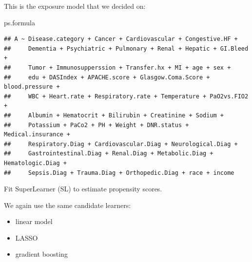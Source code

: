 \documentclass[
]{book}
\newenvironment{Shaded}{\begin{snugshade}}{\end{snugshade}}
\newcommand{\AttributeTok}[1]{\textcolor[rgb]{0.77,0.63,0.00}{#1}}
\newcommand{\DecValTok}[1]{\textcolor[rgb]{0.00,0.00,0.81}{#1}}
\newcommand{\FunctionTok}[1]{\textcolor[rgb]{0.00,0.00,0.00}{#1}}
\newcommand{\NormalTok}[1]{#1}
\newcommand{\OtherTok}[1]{\textcolor[rgb]{0.56,0.35,0.01}{#1}}
\newcommand{\SpecialCharTok}[1]{\textcolor[rgb]{0.00,0.00,0.00}{#1}}
\newcommand{\StringTok}[1]{\textcolor[rgb]{0.31,0.60,0.02}{#1}}
\providecommand{\tightlist}{%
  \setlength{\itemsep}{0pt}\setlength{\parskip}{0pt}}
\begin{document}
This is the exposure model that we decided on:

\begin{Shaded}
\begin{Highlighting}[]
\NormalTok{ps.formula}
\end{Highlighting}
\end{Shaded}

\begin{verbatim}
## A ~ Disease.category + Cancer + Cardiovascular + Congestive.HF + 
##     Dementia + Psychiatric + Pulmonary + Renal + Hepatic + GI.Bleed + 
##     Tumor + Immunosupperssion + Transfer.hx + MI + age + sex + 
##     edu + DASIndex + APACHE.score + Glasgow.Coma.Score + blood.pressure + 
##     WBC + Heart.rate + Respiratory.rate + Temperature + PaO2vs.FIO2 + 
##     Albumin + Hematocrit + Bilirubin + Creatinine + Sodium + 
##     Potassium + PaCo2 + PH + Weight + DNR.status + Medical.insurance + 
##     Respiratory.Diag + Cardiovascular.Diag + Neurological.Diag + 
##     Gastrointestinal.Diag + Renal.Diag + Metabolic.Diag + Hematologic.Diag + 
##     Sepsis.Diag + Trauma.Diag + Orthopedic.Diag + race + income
\end{verbatim}

\begin{rmdcomment}
Fit SuperLearner (SL) to estimate propensity scores.
\end{rmdcomment}

We again use the same candidate learners:

\begin{itemize}
\tightlist
\item
  linear model
\item
  LASSO
\item
  gradient boosting
\end{itemize}

\begin{Shaded}
\end{Shaded}
\end{document}
